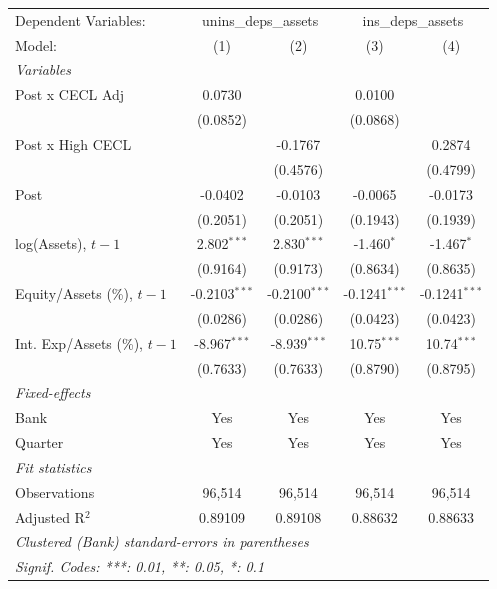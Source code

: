 
\begingroup
\centering
\begin{tabular}{lcccc}
   \tabularnewline \midrule \midrule
   Dependent Variables: & \multicolumn{2}{c}{unins\_deps\_assets} & \multicolumn{2}{c}{ins\_deps\_assets}\\
   Model:                         & (1)             & (2)             & (3)             & (4)\\  
   \midrule
   \emph{Variables}\\
   Post x CECL Adj                & 0.0730          &                 & 0.0100          &   \\   
                                  & (0.0852)        &                 & (0.0868)        &   \\   
   Post x High CECL               &                 & -0.1767         &                 & 0.2874\\   
                                  &                 & (0.4576)        &                 & (0.4799)\\   
   Post                           & -0.0402         & -0.0103         & -0.0065         & -0.0173\\   
                                  & (0.2051)        & (0.2051)        & (0.1943)        & (0.1939)\\   
   log(Assets), $t{-}1$           & 2.802$^{***}$   & 2.830$^{***}$   & -1.460$^{*}$    & -1.467$^{*}$\\   
                                  & (0.9164)        & (0.9173)        & (0.8634)        & (0.8635)\\   
   Equity/Assets (\%), $t{-}1$    & -0.2103$^{***}$ & -0.2100$^{***}$ & -0.1241$^{***}$ & -0.1241$^{***}$\\   
                                  & (0.0286)        & (0.0286)        & (0.0423)        & (0.0423)\\   
   Int. Exp/Assets (\%), $t{-}1$  & -8.967$^{***}$  & -8.939$^{***}$  & 10.75$^{***}$   & 10.74$^{***}$\\   
                                  & (0.7633)        & (0.7633)        & (0.8790)        & (0.8795)\\   
   \midrule
   \emph{Fixed-effects}\\
   Bank                           & Yes             & Yes             & Yes             & Yes\\  
   Quarter                        & Yes             & Yes             & Yes             & Yes\\  
   \midrule
   \emph{Fit statistics}\\
   Observations                   & 96,514          & 96,514          & 96,514          & 96,514\\  
   Adjusted R$^2$                 & 0.89109         & 0.89108         & 0.88632         & 0.88633\\  
   \midrule \midrule
   \multicolumn{5}{l}{\emph{Clustered (Bank) standard-errors in parentheses}}\\
   \multicolumn{5}{l}{\emph{Signif. Codes: ***: 0.01, **: 0.05, *: 0.1}}\\
\end{tabular}
\par\endgroup


